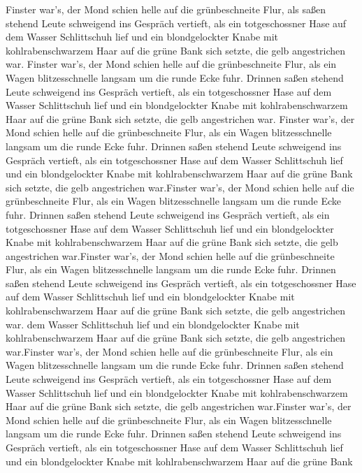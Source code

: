 \documentclass[12pt]{g-brief}
\begin{document}
\begin{g-brief}
Finster war's, der Mond schien helle auf die grünbeschneite Flur, als 
saßen stehend Leute schweigend ins Gespräch vertieft, als ein
totgeschossner Hase auf dem Wasser Schlittschuh lief und ein
blondgelockter Knabe mit kohlrabenschwarzem Haar auf die grüne Bank
sich setzte, die gelb angestrichen war.
Finster war's, der Mond schien helle auf die grünbeschneite Flur, als
ein Wagen blitzesschnelle langsam um die runde Ecke fuhr. Drinnen
saßen stehend Leute schweigend ins Gespräch vertieft, als ein
totgeschossner Hase auf dem Wasser Schlittschuh lief und ein
blondgelockter Knabe mit kohlrabenschwarzem Haar auf die grüne Bank
sich setzte, die gelb angestrichen war.
Finster war's, der Mond schien helle auf die grünbeschneite Flur, als
ein Wagen blitzesschnelle langsam um die runde Ecke fuhr. Drinnen
saßen stehend Leute schweigend ins Gespräch vertieft, als ein
totgeschossner Hase auf dem Wasser Schlittschuh lief und ein
blondgelockter Knabe mit kohlrabenschwarzem Haar auf die grüne Bank
sich setzte, die gelb angestrichen war.Finster war's, der Mond schien helle auf die grünbeschneite Flur, als
ein Wagen blitzesschnelle langsam um die runde Ecke fuhr. Drinnen
saßen stehend Leute schweigend ins Gespräch vertieft, als ein
totgeschossner Hase auf dem Wasser Schlittschuh lief und ein
blondgelockter Knabe mit kohlrabenschwarzem Haar auf die grüne Bank
sich setzte, die gelb angestrichen war.Finster war's, der Mond schien helle auf die grünbeschneite Flur, als
ein Wagen blitzesschnelle langsam um die runde Ecke fuhr. Drinnen
saßen stehend Leute schweigend ins Gespräch vertieft, als ein
totgeschossner Hase auf dem Wasser Schlittschuh lief und ein
blondgelockter Knabe mit kohlrabenschwarzem Haar auf die grüne Bank
sich setzte, die gelb angestrichen war. dem Wasser Schlittschuh lief und ein
blondgelockter Knabe mit kohlrabenschwarzem Haar auf die grüne Bank
sich setzte, die gelb angestrichen war.Finster war's, der Mond schien helle auf die grünbeschneite Flur, als
ein Wagen blitzesschnelle langsam um die runde Ecke fuhr. Drinnen
saßen stehend Leute schweigend ins Gespräch vertieft, als ein
totgeschossner Hase auf dem Wasser Schlittschuh lief und ein
blondgelockter Knabe mit kohlrabenschwarzem Haar auf die grüne Bank
sich setzte, die gelb angestrichen war.Finster war's, der Mond schien helle auf die grünbeschneite Flur, als
ein Wagen blitzesschnelle langsam um die runde Ecke fuhr. Drinnen
saßen stehend Leute schweigend ins Gespräch vertieft, als ein
totgeschossner Hase auf dem Wasser Schlittschuh lief und ein
blondgelockter Knabe mit kohlrabenschwarzem Haar auf die grüne Bank

\end{g-brief}
\end{document}
